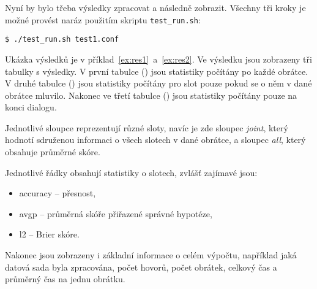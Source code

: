 Nyní by bylo třeba výsledky zpracovat a následně zobrazit.
Všechny tři kroky je možné provést naráz použitím skriptu \texttt{test\_run.sh}:

\begin{verbatim}
$ ./test_run.sh test1.conf
\end{verbatim}

Ukázka výsledků je v příklad~\ref{ex:res1}~a~\ref{ex:res2}. 
Ve výsledku jsou zobrazeny tři tabulky s výsledky. 
V první tabulce () jsou statistiky počítány po každé obrátce.
V druhé tabulce () jsou statistiky počítány pro slot pouze pokud se o něm v dané obrátce mluvilo.
Nakonec ve třetí tabulce () jsou statistiky počítány pouze na konci dialogu.

Jednotlivé sloupce reprezentují různé sloty, navíc je zde sloupec \emph{joint}, který hodnotí sdruženou informaci o všech slotech v dané obrátce, a sloupec \emph{all}, který obsahuje průměrné skóre.

Jednotlivé řádky obsahují statistiky o slotech, zvlášť zajímavé jsou:
\begin{itemize}
\item accuracy -- přesnost,
\item avgp -- průměrná skóře přiřazené správné hypotéze,
\item l2 -- Brier skóre.
\end{itemize}

Nakonec jsou zobrazeny i základní informace o celém výpočtu, například jaká datová sada byla zpracována, počet hovorů, počet obrátek, celkový čas a průměrný čas na jednu obrátku.

